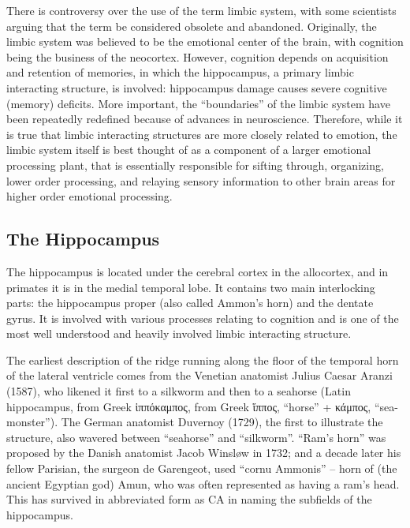 There is controversy over the use of the term limbic system, with some scientists arguing that the term be considered obsolete and abandoned. Originally, the limbic system was believed to be the emotional center of the brain, with cognition being the business of the neocortex. However, cognition depends on acquisition and retention of memories, in which the hippocampus, a primary limbic interacting structure, is involved: hippocampus damage causes severe cognitive (memory) deficits. More important, the ``boundaries'' of the limbic system have been repeatedly redefined because of advances in neuroscience. Therefore, while it is true that limbic interacting structures are more closely related to emotion, the limbic system itself is best thought of as a component of a larger emotional processing plant, that is essentially responsible for sifting through, organizing, lower order processing, and relaying sensory information to other brain areas for higher order emotional processing.

\hypertarget{the-hippocampus}{%
\subsection{The Hippocampus}\label{the-hippocampus}}

The hippocampus is located under the cerebral cortex in the allocortex, and in primates it is in the medial temporal lobe. It contains two main interlocking parts: the hippocampus proper (also called Ammon's horn) and the dentate gyrus. It is involved with various processes relating to cognition and is one of the most well understood and heavily involved limbic interacting structure.

The earliest description of the ridge running along the floor of the temporal horn of the lateral ventricle comes from the Venetian anatomist Julius Caesar Aranzi (1587), who likened it first to a silkworm and then to a seahorse (Latin hippocampus, from Greek ἱππόκαμπος, from Greek ἵππος, ``horse'' + κάμπος, ``sea-monster''). The German anatomist Duvernoy (1729), the first to illustrate the structure, also wavered between ``seahorse'' and ``silkworm''. ``Ram's horn'' was proposed by the Danish anatomist Jacob Winsløw in 1732; and a decade later his fellow Parisian, the surgeon de Garengeot, used ``cornu Ammonis'' -- horn of (the ancient Egyptian god) Amun, who was often represented as having a ram's head. This has survived in abbreviated form as CA in naming the subfields of the hippocampus.



